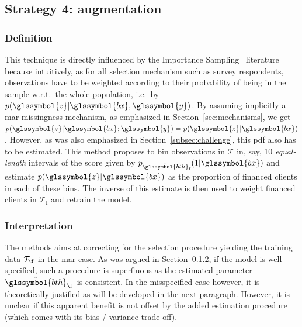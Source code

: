 \subsection{Strategy 4: augmentation}

\subsubsection{Definition}
This technique is directly influenced by the Importance Sampling~\cite{zadrozny2004learning} literature because intuitively, as for all selection mechanism such as survey respondents, observations have to be weighted according to their probability of being in the sample w.r.t.\ the whole population, i.e.\ by $p(\glssymbol{z} | \glssymbol{bx},\glssymbol{y})$. By assuming implicitly a \gls{mar} missingness mechanism, as emphasized in Section~\ref{sec:mechanisms}, we get $p(\glssymbol{z} | \glssymbol{bx}; \glssymbol{y}) = p(\glssymbol{z} | \glssymbol{bx})$. However, as was also emphasized in Section~\ref{subsec:challenge}, this \gls{pdf} also has to be estimated. This method proposes to bin observations in $\mathcal{T}$ in, say, 10 \textit{equal-length} intervals of the \gls{score} given by $p_{\hat{\glssymbol{bth}}_\text{f}}(1 | \glssymbol{bx})$ and estimate $p(\glssymbol{z} | \glssymbol{bx})$ as the proportion of financed clients in each of these bins. The inverse of this estimate is then used to weight financed clients in $\mathcal{T}_{\text{f}}$ and retrain the model.

\subsubsection{Interpretation}
The methods aims at correcting for the selection procedure yielding the training data $\mathcal{T}_{\f}$ in the \gls{mar} case. As was argued in Section~\ref{}, if the model is well-specified, such a procedure is superfluous as the estimated parameter $\hat{\glssymbol{bth}}_{\f}$ is consistent. In the misspecified case however, it is theoretically justified as will be developed in the next paragraph. However, it is unclear if this apparent benefit is not offset by the added estimation procedure (which comes with its bias / variance trade-off).

